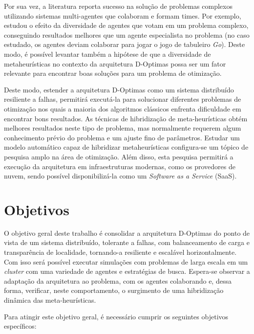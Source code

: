 Por sua vez, a literatura reporta sucesso na solução de problemas complexos utilizando sistemas multi-agentes que colaboram e formam times. Por exemplo,  estudou o efeito da diversidade de agentes que votam em um problema complexo, conseguindo resultados melhores que um agente especialista no problema (no caso estudado, os agentes deviam colaborar para jogar o jogo de tabuleiro \textit{Go}). Deste modo, é possível levantar também a hipótese de que a diversidade de metaheurísticas no contexto da arquitetura D-Optimas possa ser um fator relevante para encontrar boas soluções para um problema de otimização. 

Deste modo, estender a arquitetura D-Optimas como um sistema distribuído resiliente a falhas, permitirá executá-la para solucionar diferentes problemas de otimização nos quais a maioria dos algoritmos clássicos enfrenta dificuldade em encontrar bons resultados. As técnicas de hibridização de meta-heurísticas obtém melhores resultados neste tipo de problema, mas normalmente requerem algum conhecimento prévio do problema e um ajuste fino de parâmetros. Estudar um modelo automático capaz de hibridizar metaheurísticas configura-se um tópico de pesquisa amplo na área de otimização. Além disso, esta pesquisa permitirá a execução da arquitetura em infraestruturas modernas, como os provedores de nuvem, sendo possível disponibilizá-la como um \textit{Software as a Service} (SaaS).

\section{Objetivos}

O objetivo geral deste trabalho é consolidar a arquitetura D-Optimas do ponto de vista de um sistema distribuído, tolerante a falhas, com balanceamento de carga e transparência de localidade, tornando-a resiliente e escalável horizontalmente. Com isso será possível executar simulações com problemas de larga escala em um \textit{cluster} com uma variedade de agentes e estratégias de busca. Espera-se observar a adaptação da arquitetura ao problema, com os agentes colaborando e, dessa forma, verificar, neste comportamento,  o surgimento de uma hibridização dinâmica das meta-heurísticas.

Para atingir este objetivo geral, é necessário cumprir os seguintes objetivos específicos: 

